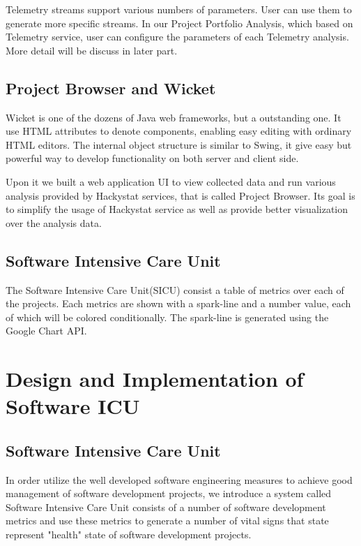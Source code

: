 Telemetry streams support various numbers of parameters. User can use them to generate more specific streams. In our Project Portfolio Analysis, which based on Telemetry service, user can configure the parameters of each Telemetry analysis. More detail will be discuss in later part.

\section {Project Browser and Wicket}
Wicket is one of the dozens of Java web frameworks, but a outstanding one. It use HTML attributes to denote components, enabling easy editing with ordinary HTML editors. The internal object structure is similar to Swing, it give easy but powerful way to develop functionality on both server and client side.

Upon it we built a web application UI to view collected data and run various analysis provided by Hackystat services, that is called Project Browser. Its goal is to simplify the usage of Hackystat service as well as provide better visualization over the analysis data.


\section {Software Intensive Care Unit}
The Software Intensive Care Unit(SICU) consist a table of metrics over each of the projects. Each metrics are shown with a spark-line and a number value, each of which will be colored conditionally. The spark-line is generated using the Google Chart API.\cite{googlechart}

\chapter{Design and Implementation of Software ICU}
\section{Software Intensive Care Unit}
In order utilize the well developed software engineering measures to achieve good management of software development projects, we introduce a system called Software Intensive Care Unit consists of a number of software development metrics and use these metrics to generate a number of vital signs that state represent "health" state of software development projects.

